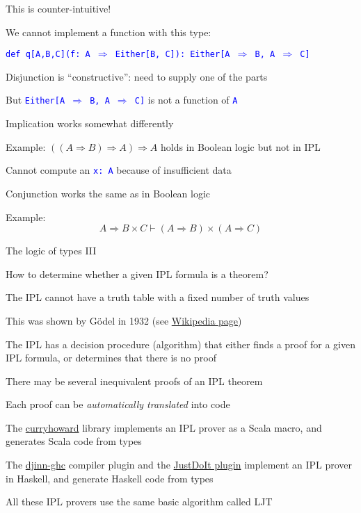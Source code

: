 This is counter-intuitive!

We cannot implement a function with this type:

\texttt{\textcolor{blue}{\footnotesize{}def q{[}A,B,C{]}(f: A $\Rightarrow$
Either{[}B, C{]}): Either{[}A $\Rightarrow$ B, A $\Rightarrow$ C{]}}}{\footnotesize\par}

Disjunction is ``constructive'': need to supply one of the parts

But \texttt{\textcolor{blue}{\footnotesize{}Either{[}A $\Rightarrow$
B, A $\Rightarrow$ C{]}}} is not a function of \texttt{\textcolor{blue}{\footnotesize{}A}} 

Implication works somewhat differently

Example: $\left(\left(A\Rightarrow B\right)\Rightarrow A\right)\Rightarrow A$
holds in Boolean logic but not in IPL

Cannot compute an \texttt{\textcolor{blue}{\footnotesize{}x:\ A}}
because of insufficient data

Conjunction works the same as in Boolean logic

Example: 
\[
A\Rightarrow B\times C\vdash\left(A\Rightarrow B\right)\times\left(A\Rightarrow C\right)
\]
 

The logic of types III

How to determine whether a given IPL formula is a theorem?

The IPL cannot have a truth table with a fixed number of truth values

This was shown by G\"odel in 1932 (see \href{https://en.wikipedia.org/wiki/Many-valued_logic}{Wikipedia page})

The IPL has a decision procedure (algorithm) that either finds a proof
for a given IPL formula, or determines that there is no proof

There may be several inequivalent proofs of an IPL theorem

Each proof can be \emph{automatically translated} into code

The \href{https://github.com/Chymyst/curryhoward}{curryhoward} library
implements an IPL prover as a Scala macro, and generates Scala code
from types

The \href{https://hackage.haskell.org/package/djinn-ghc}{djinn-ghc}
compiler plugin and the \href{https://github.com/nomeata/ghc-justdoit}{JustDoIt plugin}
implement an IPL prover in Haskell, and generate Haskell code from
types

All these IPL provers use the same basic algorithm called LJT 

